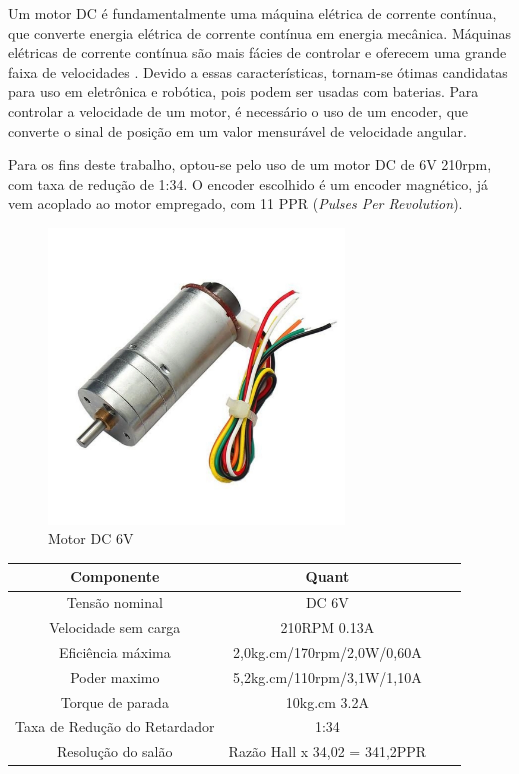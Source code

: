 
Um motor DC é fundamentalmente uma máquina elétrica de corrente contínua, que
converte energia elétrica de corrente contínua em energia mecânica. Máquinas
elétricas de corrente contínua são mais fácies de controlar e oferecem uma
grande faixa de velocidades \cite{Maquinas_eletricas}. Devido a essas
características, tornam-se ótimas candidatas para uso em eletrônica e robótica,
pois podem ser usadas com baterias. Para controlar a velocidade de um motor,
é necessário o uso de um encoder, que converte o sinal de posição em um valor
mensurável de velocidade angular.


Para os fins deste trabalho, optou-se pelo uso de um motor DC de 6V 210rpm, 
com taxa de redução de 1:34. O encoder escolhido é um encoder magnético, já
vem acoplado ao motor empregado, com 11 PPR (\textit{Pulses Per Revolution}).



\begin{figure}[h]
	\centering
	\includegraphics[width=0.7\textwidth]{figures/CHR_GM25_370}
	\caption{Motor DC 6V \cite{motor_dc_6v_encoder}}
\end{figure}

\begin{quadro}[htb]
	\caption{\label{Especificacoes_motordc_6v}Especificações do motor DC 6V}
	 \begin{tabular}{|c|c|c|c|}
		\hline
		\textbf{Componente} & \textbf{Quant} \\ \hline
		Tensão nominal & DC 6V  \\ \hline
		Velocidade sem carga  & 210RPM 0.13A  \\ \hline
		Eficiência máxima & 2,0kg.cm/170rpm/2,0W/0,60A   \\ \hline
		Poder maximo & 5,2kg.cm/110rpm/3,1W/1,10A   \\ \hline
		Torque de parada  & 10kg.cm 3.2A    \\ \hline
		Taxa de Redução do Retardador & 1:34  \\ \hline
		Resolução do salão & Razão Hall x 34,02 = 341,2PPR  \\ \hline
	\end{tabular}
	\end{quadro}
	
